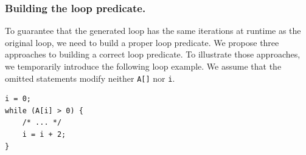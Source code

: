 \subsubsection{Building the loop predicate.}

To guarantee that the generated loop has the same iterations at runtime as the original loop, we need to build a proper loop predicate. 
We propose three approaches to building a correct loop predicate. 
To illustrate those approaches, we temporarily introduce the following loop example. We assume that the omitted statements  modify neither \texttt{A[]} nor \texttt{i}.

\begin{lstlisting}
i = 0;
while (A[i] > 0) {
    /* ... */
    i = i + 2;
}
\end{lstlisting}



